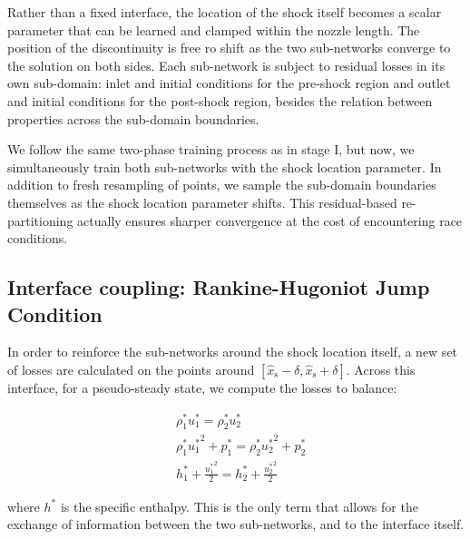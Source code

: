 Rather than a fixed interface, the location of the shock itself becomes a scalar parameter that can be learned and clamped within the nozzle length. The position of the discontinuity is free ro shift as the two sub-networks converge to the solution on both sides. Each sub-network is subject to residual losses in its own sub-domain: inlet and initial conditions for the pre-shock region and outlet and initial conditions for the post-shock region, besides the relation between properties across the sub-domain boundaries.

We follow the same two-phase training process as in stage I, but now, we simultaneously train both sub-networks with the shock location parameter. In addition to fresh resampling of points, we sample the sub-domain boundaries themselves as the shock location parameter shifts. This residual-based re-partitioning actually ensures sharper convergence at the cost of encountering race conditions.

\subsection{Interface coupling: Rankine-Hugoniot Jump Condition}

In order to reinforce the sub-networks around the shock location itself, a new set of losses are calculated on the points around $[\hat{x}_\text{s} - \delta, \hat{x}_\text{s} + \delta]$. Across this interface, for a pseudo-steady state, we compute the losses to balance:

\begin{align*}
    & \rho_1^* u_1^* = \rho_2^* u_2^*                           \\
    & \rho_1^* {u_1^*}^2 + p_1^* = \rho_2^* {u_2^*}^2 + p_2^*   \\
    & h_1^* + \frac{{u_1^*}^2}{2} = h_2^* + \frac{{u_2^*}^2}{2}
\end{align*}

where $h^*$ is the specific enthalpy. This is the only term that allows for the exchange of information between the two sub-networks, and to the interface itself.
